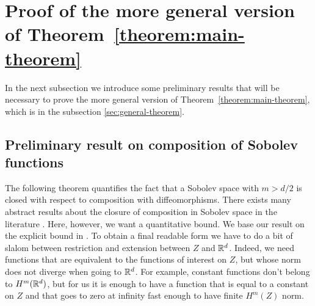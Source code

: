 \section{Proof of the more general version of Theorem~\ref{theorem:main-theorem}}


In the next subsection we introduce some preliminary results that will be necessary to prove the more general version of Theorem~\ref{theorem:main-theorem}, which is in the subsection \cref{sec:general-theorem}.

\subsection{Preliminary result on composition of Sobolev functions}\label{sec:functions}
The following theorem quantifies the fact that a Sobolev space with $m > d/2$ is closed with respect to composition with diffeomorphisms. There exists many abstract results about the closure of composition in Sobolev space in the literature  \citep[see \emph{e.g.\ }][]{bruveris2017regularity}. Here, however, we want a quantitative bound. We base our result on the explicit bound in \citet{bourdaud2011composition}. To obtain a final readable form we have to do a bit of slalom between restriction and extension between $Z$ and $\mathbb R^d$. Indeed, we need functions that are equivalent to the functions of interest on $Z$, but whose norm does not diverge when going to $\mathbb R^d$. For example, constant functions don't belong to $H^m(\mathbb R^d)$, but for us it is enough to have a function that is equal to a constant on $Z$ and that goes to zero at infinity fast enough to have finite $H^m(Z)$ norm.


